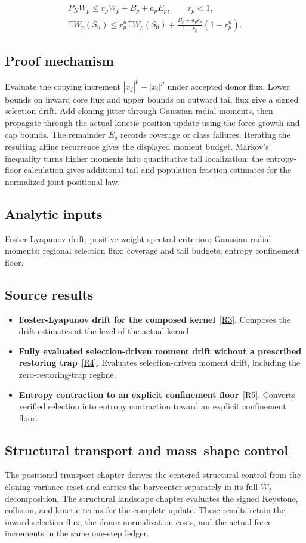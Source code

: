 \documentclass[11pt,a4paper]{article}
\begin{document}
\begin{gather*}
P_NW_p\le r_pW_p+B_p+a_pE_p,\qquad r_p<1,\\
\mathbb EW_p(S_n)\le r_p^n\mathbb EW_p(S_0)+\frac{B_p+a_p\overline e_p}{1-r_p}(1-r_p^n).
\end{gather*}
\subsection*{Proof mechanism}
Evaluate the copying increment \(|x_j|^p-|x_i|^p\) under accepted donor flux. Lower bounds on inward core flux and upper bounds on outward tail flux give a signed selection drift. Add cloning jitter through Gaussian radial moments, then propagate through the actual kinetic position update using the force-growth and cap bounds. The remainder \(E_p\) records coverage or class failures. Iterating the resulting affine recurrence gives the displayed moment budget. Markov's inequality turns higher moments into quantitative tail localization; the entropy-floor calculation gives additional tail and population-fraction estimates for the normalized joint positional law.
\subsection*{Analytic inputs}
Foster-Lyapunov drift; positive-weight spectral criterion; Gaussian radial moments; regional selection flux; coverage and tail budgets; entropy confinement floor.
\subsection*{Source results}
\begin{itemize}
\item \textbf{Foster-Lyapunov drift for the composed kernel}~\hyperref[src:thm-foster-lyapunov-main]{[R3]}. Composes the drift estimates at the level of the actual kernel.
\item \textbf{Fully evaluated selection-driven moment drift without a prescribed restoring trap}~\hyperref[src:thm-slceg-full-moment]{[R4]}. Evaluates selection-driven moment drift, including the zero-restoring-trap regime.
\item \textbf{Entropy contraction to an explicit confinement floor}~\hyperref[src:thm-slce-entropy-floor]{[R5]}. Converts verified selection into entropy contraction toward an explicit confinement floor.
\end{itemize}
\subsection*{Structural transport and mass--shape control}
The positional transport chapter derives the centered structural control from the cloning variance reset and carries the barycenter separately in its full \(W_2\) decomposition. The structural landscape chapter evaluates the signed Keystone, collision, and kinetic terms for the complete update. These results retain the inward selection flux, the donor-normalization costs, and the actual force increments in the same one-step ledger.
\end{document}

